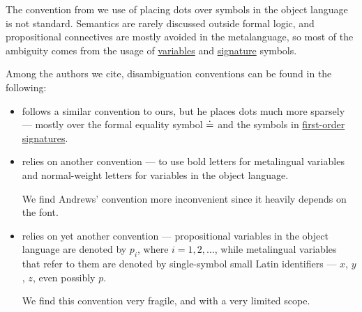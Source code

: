 \begin{remark}\label{rem:object_language_disambiguation_conventions}
  The convention from  we use of placing dots over symbols in the object language is not standard. Semantics are rarely discussed outside formal logic, and propositional connectives are mostly avoided in the metalanguage, so most of the ambiguity comes from the usage of \hyperref[con:variable]{variables} and \hyperref[con:logical_system_signature]{signature} symbols.

  Among the authors we cite, disambiguation conventions can be found in the following:
  \begin{itemize}
    \item {} follows a similar convention to ours, but he places dots much more sparsely --- mostly over the formal equality symbol \( {\doteq} \) and the symbols in \hyperref[def:first_order_signature]{first-order signatures}.

    \item {} relies on another convention --- to use bold letters for metalingual variables and normal-weight letters for variables in the object language.

    We find Andrews' convention more inconvenient since it heavily depends on the font.

    \item {} relies on yet another convention --- propositional variables in the object language are denoted by \( p_i \), where \( i = 1, 2, \ldots \), while metalingual variables that refer to them are denoted by single-symbol small Latin identifiers --- \( x \), \( y \), \( z \), even possibly \( p \).

    We find this convention very fragile, and with a very limited scope.
  \end{itemize}
\end{remark}
